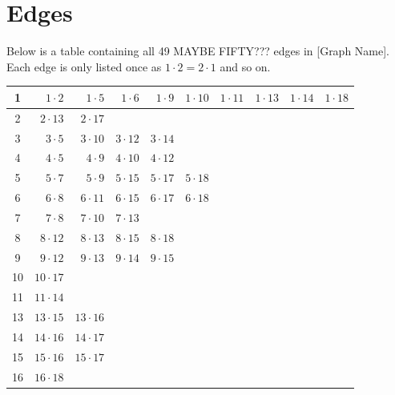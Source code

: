 \documentclass{article}
\begin{document}
\section{Edges}
Below is a table containing all 49 MAYBE FIFTY??? edges in [Graph Name]. Each edge is only listed once as $1 \cdot 2 = 2 \cdot 1$ and so on.
\begin{table}[ht!]
  \begin{center}
    \begin{tabular}{|c||r|r|r|r|r|r|r|r|r|}
    \hline
    
    \hline

      1 & $1 \cdot2$ & $1 \cdot5$ & $1 \cdot6$ & $1 \cdot9$ & $1 \cdot10$ & $1 \cdot11$ & $1 \cdot13$ & $1 \cdot14$ & $1 \cdot18$ \\
        \hline
      2 & $2 \cdot13$ & $2 \cdot17$ & & & & & & &  \\
      \hline
      3 & $3 \cdot5$ & $3 \cdot10$ & $3 \cdot12$ & $3 \cdot14$ &&&&&   \\
      \hline
      4 & $ 4\cdot5$ & $4 \cdot9$ & $4 \cdot10$ & $4 \cdot12$ &&&&&  \\
      \hline
      5 & $5 \cdot7$ & $5 \cdot9$ & $5 \cdot15$ & $5 \cdot17$ & $5 \cdot18$ &&&&  \\
      \hline
      6 & $6 \cdot8$ & $6 \cdot11$ & $6 \cdot15$ & $6 \cdot17$ & $6 \cdot18$ &&&&  \\
      \hline
      7 & $7 \cdot8$ & $7 \cdot10$ & $7 \cdot13$ &&&&&& \\
      \hline
      8 & $8 \cdot12$ & $8 \cdot13$ & $8 \cdot15$ & $8 \cdot18$ &&&&& \\
      \hline
      9 & $9 \cdot12$ & $9 \cdot13$ & $9 \cdot14$ & $9 \cdot15$ &&&&& \\
      \hline
      10 & $10 \cdot17$ &&&&&&&& \\
      \hline
      11 & $11 \cdot14$ &&&&&&&& \\
      \hline
      13 & $13 \cdot15$ & $13 \cdot16$ &&&&&&& \\
      \hline
      14 & $14 \cdot16$ & $14 \cdot17$  &&&&&&& \\
      \hline
      15 & $15 \cdot16$ & $15 \cdot17$ &&&&&&& \\
      \hline
      16 & $16 \cdot18$ &&&&&&&& \\
      \hline

    \end{tabular}
  \end{center}
\label{tab:edges}
\end{table}
\end{document}
